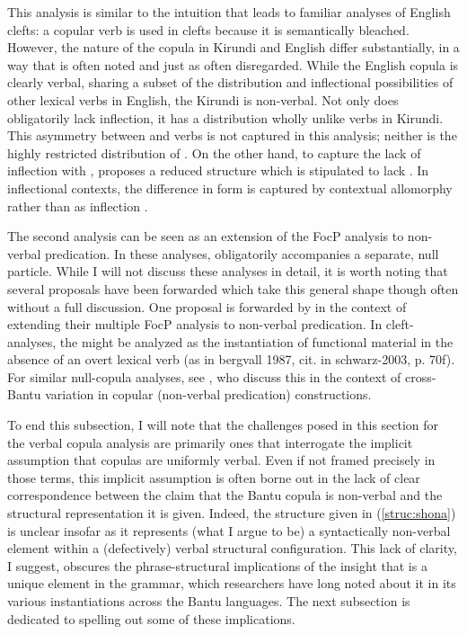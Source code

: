 \documentclass[12pt]{article}
\begin{document}
This analysis is similar to the intuition that leads to familiar analyses of English clefts: a copular verb is used in clefts because it is semantically bleached. However, the nature of the copula in Kirundi and English differ substantially, in a way that is often noted and just as often disregarded. While the English copula is clearly verbal, sharing a subset of the distribution and inflectional possibilities of other lexical verbs in English, the Kirundi  is non-verbal. Not only does  obligatorily lack inflection, it has a distribution wholly unlike verbs in Kirundi. This asymmetry between  and verbs is not captured in this analysis; neither is the highly restricted distribution of . On the other hand, to capture the lack of inflection with , \citet[199]{zentz-2016} proposes a reduced structure which is stipulated to lack . In inflectional contexts, the difference in form is captured by contextual allomorphy rather than as inflection \citep[p. 160]{zentz-2016}.


The second analysis can be seen as an extension of the FocP analysis to non-verbal predication. In these analyses,  obligatorily accompanies a separate, null particle. While I will not discuss these analyses in detail, it is worth noting that several proposals have been forwarded which take this general shape though often without a full discussion. One proposal is forwarded by \citet[p. 690fn]{abels-muriungi-2008} in the context of extending their multiple FocP analysis to non-verbal predication. In cleft-analyses, the  might be analyzed as the instantiation of functional material in the absence of an overt lexical verb (as in bergvall 1987, cit. in schwarz-2003, p. 70f). For similar null-copula analyses, see \citet{gibson-et-al-2019}, who discuss this in the context of cross-Bantu variation in copular (non-verbal predication) constructions.

To end this subsection, I will note that the challenges posed in this section for the verbal copula analysis are primarily ones that interrogate the implicit assumption that copulas are uniformly verbal. Even if not framed precisely in those terms, this implicit assumption is often borne out in the lack of clear correspondence between the claim that the Bantu copula is non-verbal and the structural representation it is given. Indeed, the structure given in (\ref{struc:shona}) is unclear insofar as it represents (what I argue to be) a syntactically non-verbal element within a (defectively) verbal structural configuration. This lack of clarity, I suggest, obscures the phrase-structural implications of the insight that  is a unique element in the grammar, which researchers have long noted about it in its various instantiations across the Bantu languages. The next subsection is dedicated to spelling out some of these implications.
\end{document}
